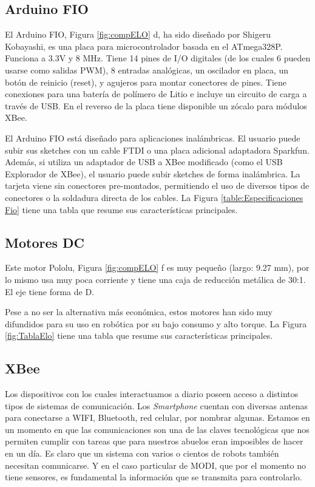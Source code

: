 \subsection{Arduino FIO}
El Arduino FIO, Figura \ref{fig:compELO} d, ha sido diseñado por Shigeru Kobayashi, es una placa para microcontrolador basada en el ATmega328P. Funciona a 3.3V y 8 MHz. Tiene 14 pines de I/O digitales (de los cuales 6 pueden usarse como salidas PWM), 8 entradas analógicas, un oscilador en placa, un botón de reinicio (reset), y agujeros para montar conectores de pines. Tiene conexiones para una batería de polímero de Litio e incluye un circuito de carga a través de USB. En el reverso de la placa tiene disponible un zócalo para módulos XBee.

El Arduino FIO está diseñado para aplicaciones inalámbricas. El usuario puede subir sus sketches con un cable FTDI o una placa adicional adaptadora Sparkfun. Además, si utiliza un adaptador de USB a XBee modificado (como el USB Explorador de XBee), el usuario puede subir sketches de forma inalámbrica. La tarjeta viene sin conectores pre-montados, permitiendo el uso de diversos tipos de conectores o la soldadura directa de los cables. La Figura \ref{table:Especificaciones Fio} tiene una tabla que resume sus características principales.

\subsection{Motores DC}
Este motor Pololu, Figura \ref{fig:compELO} f es muy pequeño (largo: 9.27 mm), por lo mismo usa muy poca corriente y tiene una caja de reducción metálica de 30:1. El eje tiene forma de D.

Pese a no ser la alternativa más económica, estos motores han sido muy difundidos para su uso en robótica por su bajo consumo y alto torque. La Figura \ref{fig:TablaElo} tiene una tabla que resume sus características principales.

\subsection{XBee}

Los dispositivos con los cuales interactuamos a diario poseen acceso a distintos tipos de sistemas de comunicación. Los \textit{Smartphone} cuentan con diversas antenas para conectarse a WIFI, Bluetooth, red celular,  por nombrar algunas. Estamos en un momento en que las comunicaciones son una de las claves tecnológicas que nos permiten cumplir con tareas que para nuestros abuelos eran imposibles de hacer en un día. Es claro que un sistema con varios o cientos de robots también necesitan comunicarse. Y en el caso particular de MODI, que por el momento no tiene sensores, es fundamental la información que se transmita para controlarlo. 

